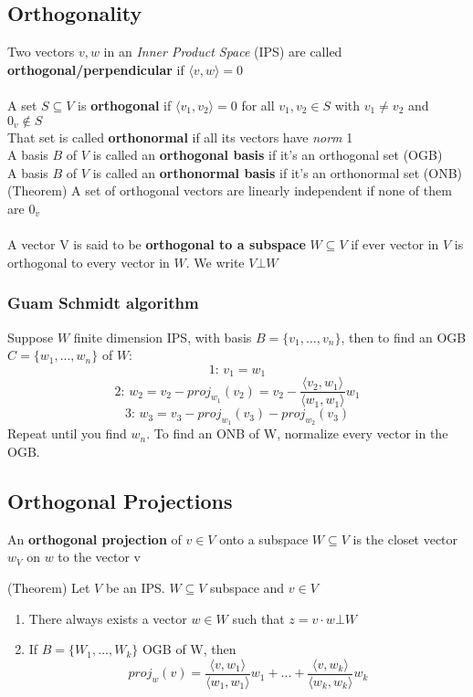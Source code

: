 \documentclass{article}
\begin{document}
\subsection{Orthogonality}
Two vectors $v,w$ in an \textit{Inner Product Space} (IPS) are called \textbf{orthogonal/perpendicular} if $\langle v,w\rangle =0$
\\\\
A set $S\subseteq V$ is \textbf{orthogonal} if $\langle v_1,v_2\rangle =0$ for all $v_1,v_2\in S$ with $v_1\neq v_2$ and $0_v \notin S$\\
That set is called \textbf{orthonormal} if all its vectors have \textit{norm} 1\\
A basis $B$ of $V$ is called an \textbf{orthogonal basis} if it's an orthogonal set (OGB)\\
A basis $B$ of $V$ is called an \textbf{orthonormal basis} if it's an orthonormal set (ONB)
\\(Theorem) A set of orthogonal vectors are linearly independent if none of them are $0_v$\\\\
A vector V is said to be \textbf{orthogonal to a subspace} $W\subseteq V$ if ever vector in $V$ is orthogonal to every vector in $W$. We write $V\bot W$  
\subsubsection{Guam Schmidt algorithm}
Suppose $W$ finite dimension IPS, with basis $B=\{v_1,...,v_n\}$, then to find an OGB $C=\{w_1,...,w_n\}$ of $W$:
 \[\text{1: } v_1=w_1\]
\[\text{2:  }w_2=v_2-proj_{w_1}(v_2)= v_2 -\frac{\langle v_2,w_1\rangle}{\langle w_1,w_1 \rangle}w_1\]
\[\text{3: }w_3=v_3-proj_{w_1}(v_3)-proj_{w_2}(v_3)\]
Repeat until you find $w_n$. To find an ONB of W, normalize every vector in the OGB.
\subsection{Orthogonal Projections}
An \textbf{orthogonal projection} of $v\in V$ onto a subspace $W\subseteq V$ is the closet vector $w_V$ on $w$ to the vector v

(Theorem) Let $V$ be an IPS. $W\subseteq V$ subspace and $v\in V$
\begin{enumerate}
    \item There always exists a vector $w\in W$ such that $z=v\cdot w\bot W$
    \item If $B=\{W_1,...,W_k\}$ OGB of W, then
    \[proj_{w}(v) = \frac{\langle v,w_1\rangle}{\langle w_1,w_1 \rangle}w_1+...+\frac{\langle v,w_k\rangle}{\langle w_k,w_k \rangle}w_k\]
\end{enumerate}
\end{document}
